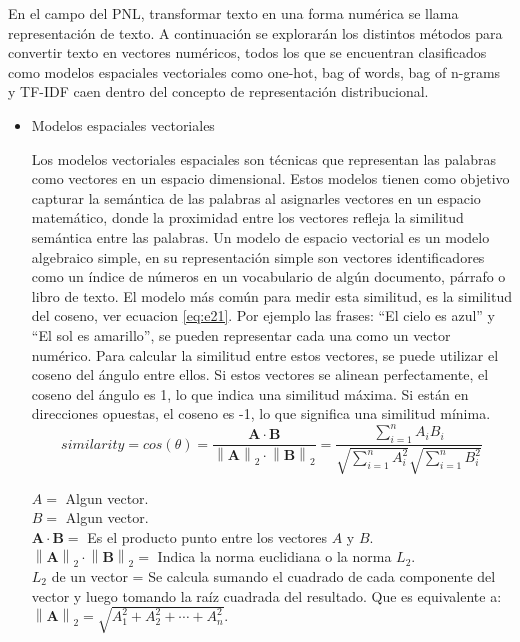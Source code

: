 En el campo del PNL, transformar texto en una forma numérica se llama representación de texto. A continuación se explorarán los distintos métodos para convertir texto en vectores numéricos, todos los que se encuentran clasificados como modelos espaciales vectoriales como one-hot, bag of words, bag of n-grams y TF-IDF  caen dentro del concepto de representación distribucional.

\begin{itemize}
\item Modelos espaciales vectoriales


Los modelos vectoriales espaciales son técnicas que representan las palabras como vectores en un espacio dimensional. Estos modelos tienen como objetivo capturar la semántica de las palabras al asignarles vectores en un espacio matemático, donde la proximidad entre los vectores refleja la similitud semántica entre las palabras. Un modelo de espacio vectorial  es un modelo algebraico simple, en su representación simple son vectores identificadores como un índice de números en un vocabulario de algún documento, párrafo o libro de texto. El modelo más común para medir esta similitud, es la similitud del coseno, ver ecuacion \ref{eq:e21}. Por ejemplo las frases: ``El cielo es azul'' y ``El sol es amarillo'', se pueden representar cada una como un vector numérico. Para calcular la similitud entre estos vectores, se puede utilizar  el coseno del ángulo entre ellos. Si estos vectores se alinean perfectamente, el coseno del ángulo es 1, lo que indica una similitud máxima. Si están en direcciones opuestas, el coseno es -1, lo que significa una similitud mínima.
\begin{equation} \label{eq:e21} 
	similarity = cos(\theta) = \frac{\mathbf{A} \cdot \mathbf{B}}{\left \|  \mathbf{A} \right \|_2\cdot \left \|  \mathbf{B} \right \|_2}=\frac{\displaystyle\sum_{i=1}^{n}A_iB_i}{\sqrt{\displaystyle\sum_{i=1}^{n}A_i^2}\sqrt{\displaystyle\sum_{i=1}^{n}B_i^2}}
\end{equation}


$A = $  Algun vector.\\
$B = $  Algun vector.\\
$\mathbf{A} \cdot \mathbf{B} =$ Es el producto punto entre los vectores $A$ y $B$.\\
$\left \|  \mathbf{A} \right \|_2\cdot \left \|  \mathbf{B} \right \|_2 = $ Indica la norma euclidiana o la norma $L_2$. \\
$L_2$  de un vector = Se calcula sumando el cuadrado de cada componente del vector y luego tomando la raíz cuadrada del resultado. Que es equivalente a: 
$\left \|  \mathbf{A} \right \|_2 = \sqrt{A_1^2 + A_2^2 + \cdots + A_n^2} $.\\



\end{itemize}
